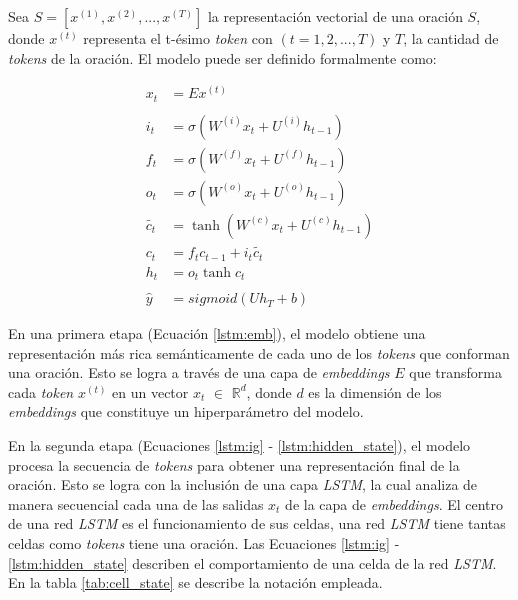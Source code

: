 Sea $S = [x^{(1)}, x^{(2)}, ..., x^{(T)}]$ la representación vectorial de una oración $S$, donde $x^{(t)}$ representa el t-ésimo \textit{token} con $(t = 1, 2, ..., T)$ y $T$, la cantidad de \textit{tokens} de la oración. El modelo puede ser definido formalmente como:

\begin{align}
  x_{t} &= Ex^{(t)} \label{lstm:emb} \\
  \nonumber \\
  i_{t} &= \sigma{(W^{(i)} x_{t} + U^{(i)}h_{t-1})} \label{lstm:ig} \\
  f_{t} &= \sigma{(W^{(f)} x_{t} + U^{(f)}h_{t-1})} \label{lstm:fg} \\
  o_{t} &= \sigma{(W^{(o)} x_{t} + U^{(o)}h_{t-1})} \label{lstm:og} \\
  \tilde{c_{t}} &= \tanh(W^{(c)} x_{t} + U^{(c)}h_{t-1}) \label{lstm:new_memory_generation} \\
  c_{t} &= f_{t}c_{t-1} + i_{t}\tilde{c_{t}} \label{lstm:cell_state} \\
  h_{t} &= o_{t}\tanh{c_{t}} \label{lstm:hidden_state} \\
  \nonumber \\
  \hat{y} &= sigmoid(Uh_{T} + b) \label{lstm:pred}
\end{align}

En una primera etapa (Ecuación \ref{lstm:emb}), el modelo obtiene una representación más rica semánticamente de cada uno de los \textit{tokens} que conforman una oración. Esto se logra a través de una capa de \textit{embeddings} $E$ que transforma cada \textit{token} $x^{(t)}$ en un vector $x_{t}$ $\in$ ${\mathbb{R}} ^{d}$, donde $d$ es la dimensión de los \textit{embeddings} que constituye un hiperparámetro del modelo.

En la segunda etapa (Ecuaciones \ref{lstm:ig} - \ref{lstm:hidden_state}), el modelo procesa la secuencia de \textit{tokens} para obtener una representación final de la oración. Esto se logra con la inclusión de una capa \textit{LSTM}, la cual analiza de manera secuencial cada una de las salidas $x_{t}$ de la capa de \textit{embeddings}. El centro de una red \textit{LSTM} es el funcionamiento de sus celdas, una red \textit{LSTM} tiene tantas celdas como \textit{tokens} tiene una oración. Las Ecuaciones \ref{lstm:ig} - \ref{lstm:hidden_state} describen el comportamiento de una celda de la red \textit{LSTM}. En la tabla \ref{tab:cell_state} se describe la notación empleada.

